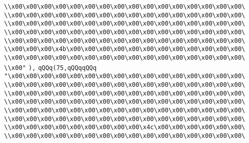 \verb|\\x00\x00\x00\x00\x00\x00\x00\x00\x00\x00\x00\x00\x00\x00\x00\x00\|\newline
\verb|\\x00\x00\x00\x00\x00\x00\x00\x00\x00\x00\x00\x00\x00\x00\x00\x00\|\newline
\verb|\\x00\x00\x00\x00\x00\x00\x00\x00\x00\x00\x00\x00\x00\x00\x00\x00\|\newline
\verb|\\x00\x00\x00\x00\x00\x00\x00\x00\x00\x00\x00\x00\x00\x00\x00\x00\|\newline
\verb|\\x00\x00\x00\x00\x00\x00\x00\x00\x00\x00\x00\x00\x00\x00\x00\x00\|\newline
\verb|\\x00\x00\x00\x4b\x00\x00\x00\x00\x00\x00\x00\x00\x00\x00\x00\x00\|\newline
\verb|\\x00\x00\x00\x00\x00\x00\x00\x00\x00\x00\x00\x00\x00\x00\x00\x00\|\newline
\verb|\\x00"|\newline
\verb|),|\newline
\verb|qQQq(75,qQQqqQQq|\newline
\verb|"\x00\x00\x00\x00\x00\x00\x00\x00\x00\x00\x00\x00\x00\x00\x00\x00\|\newline
\verb|\\x00\x00\x00\x00\x00\x00\x00\x00\x00\x00\x00\x00\x00\x00\x00\x00\|\newline
\verb|\\x00\x00\x00\x00\x00\x00\x00\x00\x00\x00\x00\x00\x00\x00\x00\x00\|\newline
\verb|\\x00\x00\x00\x00\x00\x00\x00\x00\x00\x00\x00\x00\x00\x00\x00\x00\|\newline
\verb|\\x00\x00\x00\x00\x00\x00\x00\x00\x00\x00\x00\x00\x00\x00\x00\x00\|\newline
\verb|\\x00\x00\x00\x00\x00\x00\x00\x00\x00\x00\x00\x00\x00\x00\x00\x00\|\newline
\verb|\\x00\x00\x00\x00\x00\x00\x00\x00\x00\x4c\x00\x00\x00\x00\x00\x00\|\newline
\verb|\\x00\x00\x00\x00\x00\x00\x00\x00\x00\x00\x00\x00\x00\x00\x00\x00\|\newline
